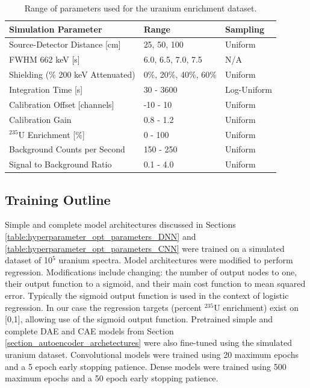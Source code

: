 \begin{table}[H]
\centering
\caption{Range of parameters used for the uranium enrichment dataset.}
\label{table:hyperparameter_dataset_full_parameters_enrichment}
\begin{tabular}{lll}
\hline
\textbf{Simulation Parameter} & \textbf{Range} & \textbf{Sampling} \\ \hline
Source-Detector Distance [cm] & 25, 50, 100 & Uniform \\ %
FWHM 662 keV [s] & 6.0, 6.5, 7.0, 7.5 & N/A \\ %
Shielding (\% 200 keV Attenuated) & 0\%, 20\%, 40\%, 60\% & Uniform \\ %
Integration Time [s] & 30 - 3600 & Log-Uniform \\ %
Calibration Offset [channels] & -10 - 10 & Uniform \\ %
Calibration Gain & 0.8 - 1.2 & Uniform \\ %
$^{235}$U Enrichment [\%] & 0 - 100 & Uniform \\ %
Background Counts per Second & 150 - 250 & Uniform \\ %
Signal to Background Ratio & 0.1 - 4.0 & Uniform \\ \hline
\end{tabular}
\end{table}


\subsection{Training Outline}

Simple and complete model architectures discussed in Sections \ref{table:hyperparameter_opt_parameters_DNN} and \ref{table:hyperparameter_opt_parameters_CNN} were trained on a simulated dataset of 10$^{5}$ uranium spectra. Model architectures were modified to perform regression. Modifications include changing: the number of output nodes to one, their output function to a sigmoid, and their main cost function to mean squared error. Typically the sigmoid output function is used in the context of logistic regression. In our case the regression targets (percent $^{235}$U enrichment) exist on [0,1], allowing use of the sigmoid output function. Pretrained simple and complete DAE and CAE models from Section \ref{section_autoencoder_archetectures} were also fine-tuned using the simulated uranium dataset. Convolutional models were trained using 20 maximum epochs and a 5 epoch early stopping patience. Dense models were trained using 500 maximum epochs and a 50 epoch early stopping patience.


